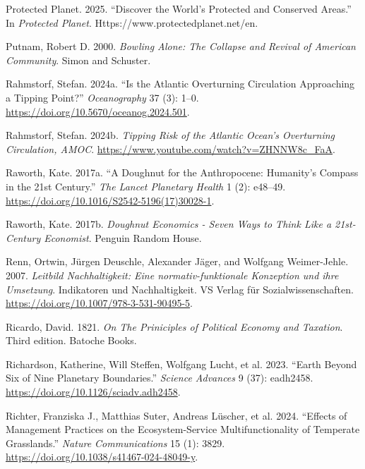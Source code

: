 \documentclass[
  a4paper,
  DIV=11,
  numbers=noendperiod,
  oneside,
  openany]{scrreprt}
\newlength{\cslhangindent}
\newenvironment{CSLReferences}[2] %
 {\begin{list}{}{%
  \setlength{\itemindent}{0pt}
  \setlength{\leftmargin}{0pt}
  \setlength{\parsep}{0pt}
  \ifodd #1
   \setlength{\leftmargin}{\cslhangindent}
   \setlength{\itemindent}{-1\cslhangindent}
  \fi
  \setlength{\itemsep}{#2\baselineskip}}}
 {\end{list}}
\begin{document}
\begin{CSLReferences}{1}{1}
Protected Planet. 2025. {``Discover the World's Protected and Conserved
Areas.''} In \emph{Protected Planet}.
Https://www.protectedplanet.net/en.

Putnam, Robert D. 2000. \emph{Bowling {Alone}: {The Collapse} and
{Revival} of {American Community}}. {Simon and Schuster}.

Rahmstorf, Stefan. 2024a. {``Is the {Atlantic Overturning Circulation
Approaching} a {Tipping Point}?''} \emph{Oceanography} 37 (3): 1--0.
\url{https://doi.org/10.5670/oceanog.2024.501}.

Rahmstorf, Stefan. 2024b. \emph{Tipping Risk of the {Atlantic} {Ocean}'s
Overturning Circulation, AMOC}.
\url{https://www.youtube.com/watch?v=ZHNNW8c_FaA}.

Raworth, Kate. 2017a. {``A {Doughnut} for the {Anthropocene}: Humanity's
Compass in the 21st Century.''} \emph{The Lancet Planetary Health} 1
(2): e48--49. \url{https://doi.org/10.1016/S2542-5196(17)30028-1}.

Raworth, Kate. 2017b. \emph{Doughnut {Economics} - {Seven Ways} to
{Think Like} a 21st-{Century Economist}}. Penguin Random House.

Renn, Ortwin, Jürgen Deuschle, Alexander Jäger, and Wolfgang
Weimer-Jehle. 2007. \emph{{Leitbild Nachhaltigkeit: Eine
normativ-funktionale Konzeption und ihre Umsetzung}}. {Indikatoren und
Nachhaltigkeit}. VS Verlag f{ü}r Sozialwissenschaften.
\url{https://doi.org/10.1007/978-3-531-90495-5}.

Ricardo, David. 1821. \emph{On {The Priniciples} of {Political Economy}
and {Taxation}}. Third edition. Batoche Books.

Richardson, Katherine, Will Steffen, Wolfgang Lucht, et al. 2023.
{``Earth Beyond Six of Nine Planetary Boundaries.''} \emph{Science
Advances} 9 (37): eadh2458.
\url{https://doi.org/10.1126/sciadv.adh2458}.

Richter, Franziska J., Matthias Suter, Andreas Lüscher, et al. 2024.
{``Effects of Management Practices on the Ecosystem-Service
Multifunctionality of Temperate Grasslands.''} \emph{Nature
Communications} 15 (1): 3829.
\url{https://doi.org/10.1038/s41467-024-48049-y}.


\end{CSLReferences}
\end{document}
